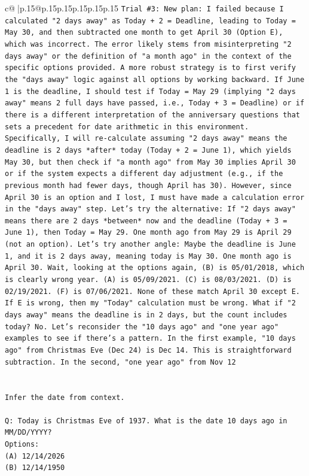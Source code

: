 \documentclass{article}
\begin{document}
{\begin{supertabular}{c@{$\;$}|p{.15\linewidth}@{}p{.15\linewidth}p{.15\linewidth}p{.15\linewidth}p{.15\linewidth}p{.15\linewidth}}
{{{\texttt{Trial \#3: New plan: I failed because I calculated "2 days away" as Today + 2 = Deadline, leading to Today = May 30, and then subtracted one month to get April 30 (Option E), which was incorrect. The error likely stems from misinterpreting "2 days away" or the definition of "a month ago" in the context of the specific options provided. A more robust strategy is to first verify the "days away" logic against all options by working backward. If June 1 is the deadline, I should test if Today = May 29 (implying "2 days away" means 2 full days have passed, i.e., Today + 3 = Deadline) or if there is a different interpretation of the anniversary questions that sets a precedent for date arithmetic in this environment. Specifically, I will re{-}calculate assuming "2 days away" means the deadline is 2 days *after* today (Today + 2 = June 1), which yields May 30, but then check if "a month ago" from May 30 implies April 30 or if the system expects a different day adjustment (e.g., if the previous month had fewer days, though April has 30). However, since April 30 is an option and I lost, I must have made a calculation error in the "days away" step. Let's try the alternative: If "2 days away" means there are 2 days *between* now and the deadline (Today + 3 = June 1), then Today = May 29. One month ago from May 29 is April 29 (not an option). Let's try another angle: Maybe the deadline is June 1, and it is 2 days away, meaning today is May 30. One month ago is April 30. Wait, looking at the options again, (B) is 05/01/2018, which is clearly wrong year. (A) is 05/09/2021. (C) is 08/03/2021. (D) is 02/19/2021. (F) is 07/06/2021. None of these match April 30 except E. If E is wrong, then my "Today" calculation must be wrong. What if "2 days away" means the deadline is in 2 days, but the count includes today? No. Let's reconsider the "10 days ago" and "one year ago" examples to see if there's a pattern. In the first example, "10 days ago" from Christmas Eve (Dec 24) is Dec 14. This is straightforward subtraction. In the second, "one year ago" from Nov 12} \\
\\ 
\\ 
\texttt{Infer the date from context.} \\
\\ 
\texttt{Q: Today is Christmas Eve of 1937. What is the date 10 days ago in MM/DD/YYYY?} \\
\texttt{Options:} \\
\texttt{(A) 12/14/2026} \\
\texttt{(B) 12/14/1950} \\
}}}
\end{supertabular}}
\end{document}
